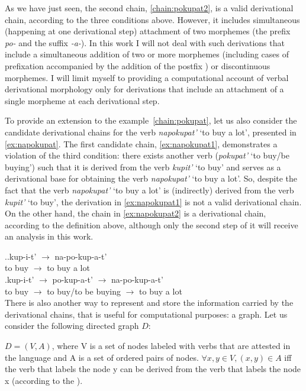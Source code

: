 As we have just seen, the second chain, \ref{chain:pokupat2}, is a valid derivational chain, according to the three conditions above. However, it includes simultaneous (happening at one derivational step) attachment of two morphemes (the prefix \textit{po-}   and the suffix \textit{-a-}). In this work I will not deal with such derivations that include a simultaneous addition of two or more morphemes (including cases of prefixation  accompanied by the addition of the postfix ) or discontinuous morphemes. I will limit myself to providing a computational account of verbal derivational morphology only for derivations that include an attachment of a single morpheme at each derivational step.

To provide an extension to the example~\ref{chain:pokupat}, let us also consider the candidate derivational chains for the verb \textit{napokupat'} `to buy a lot', presented in \ref{ex:napokupat}. The first candidate chain, \ref{ex:napokupat1}, demonstrates a violation of the third condition: there exists another verb (\textit{pokupat'} `to buy/be buying') such that it is derived from the verb \textit{kupit'} `to buy' and serves as a derivational base for obtaining the verb \textit{napokupat'} `to buy a lot'. So, despite the fact that the verb \textit{napokupat'} `to buy a lot' is (indirectly) derived from the verb \textit{kupit'} `to buy', the derivation in \ref{ex:napokupat1} is not a valid derivational chain. On the other hand, the chain in \ref{ex:napokupat2} is a derivational chain, according to the definition above, although only the second step of it will receive an analysis in this work. 

\ex.\label{ex:napokupat}\ag.\label{ex:napokupat1}kup-i-t'\textsuperscript{\PF} $\rightarrow$ na-po-kup-a-t'\textsuperscript{\PF}\\	
{to buy} $\rightarrow$ {to buy a lot}\\
\bg.\label{ex:napokupat2}kup-i-t'\textsuperscript{\PF} $\rightarrow$ po-kup-a-t'\textsuperscript{\IPF} $\rightarrow$ na-po-kup-a-t'\textsuperscript{\PF}\\
{to buy} $\rightarrow$ {to buy/to be buying} $\rightarrow$ {to buy a lot}\\

There is also another way to represent and store the information carried by the derivational chains, that is useful for computational purposes: a graph. Let us consider the following directed graph $D$: 
\begin{definition}\label{def:chain}
$D = (V,A)$, where V is a set of nodes labeled with verbs that are attested in the language and A is a set of ordered pairs of nodes. $\forall x,y \in V, (x,y) \in A$ iff  the verb that labels the node y can be derived from the verb that labels the node x (according to the ).
\end{definition}

